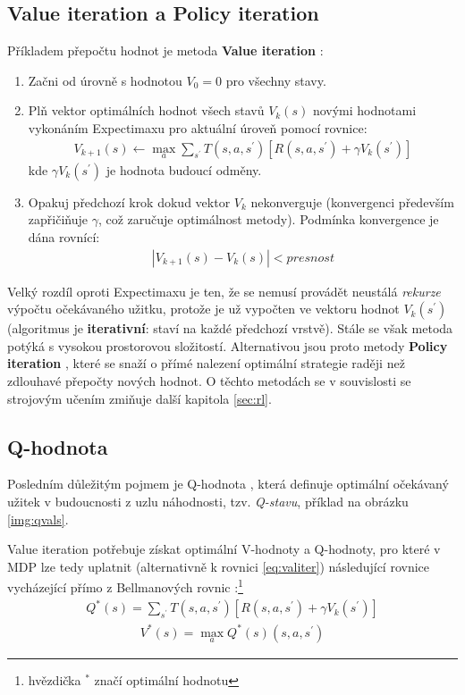 \subsection*{Value iteration a Policy iteration}
\label{teorie:valiter}
Příkladem přepočtu hodnot je metoda \textbf{Value iteration} \cite{RLAprox}:
\begin{enumerate}
\item Začni od úrovně s hodnotou $V_{0} = 0$ pro všechny stavy.
\item Plň vektor optimálních hodnot všech stavů $V_{k}(s)$ novými hodnotami vykonáním Expectimaxu pro aktuální úroveň pomocí rovnice:
\begin{align}
\label{eq:valiter}
V_{k+1}(s) \leftarrow \max_a \sum_{s^\prime}T(s,a,s^\prime) \left[R(s,a,s^\prime)+\gamma V_k(s^\prime) \right]
\end{align}
kde $\gamma V_k(s^\prime)$ je hodnota budoucí odměny.
\item Opakuj předchozí krok dokud vektor $V_k$ nekonverguje (konvergenci především zapřičiňuje $\gamma$, což zaručuje optimálnost metody). Podmínka konvergence je dána rovnící:
\begin{align}
\left|V_{k+1}(s)-V_k(s) \right| < presnost
\end{align}
\end{enumerate}
Velký rozdíl oproti Expectimaxu je ten, že se nemusí provádět neustálá \textit{rekurze} výpočtu očekávaného užitku, protože je už vypočten ve vektoru hodnot $V_k(s^\prime)$ (algoritmus je \textbf{iterativní}: staví na každé předchozí vrstvě). Stále se však metoda potýká s vysokou prostorovou složitostí. Alternativou jsou proto metody \textbf{Policy iteration} \cite{RLAprox}, které se snaží o přímé nalezení optimální strategie raději než zdlouhavé přepočty nových hodnot. O těchto metodách se v souvislosti se strojovým učením zmiňuje další kapitola \ref{sec:rl}.

\subsection*{Q-hodnota}
\label{teorie:valiterq}
Posledním důležitým pojmem je Q-hodnota \cite{RLIntro}, která definuje optimální očekávaný užitek v budoucnosti z uzlu náhodnosti, tzv. \textit{Q-stavu}, příklad na obrázku \ref{img:qvals}.

Value iteration potřebuje získat optimální V-hodnoty a Q-hodnoty, pro které v MDP lze tedy uplatnit (alternativně k rovnici \ref{eq:valiter}) následující rovnice vycházející přímo z Bellmanových rovnic \cite{mas}:\footnote{hvězdička $^{*}$ značí optimální hodnotu}
\begin{align}
\label{eq:valiter21}
Q^*(s) = \sum_{s^\prime}T(s,a,s^\prime) \left[R(s,a,s^\prime)+\gamma V_k(s^\prime) \right]
\end{align}
\begin{align}
\label{eq:valiter22}
V^*(s) = \max_a Q^*(s) (s,a,s^\prime)
\end{align}

